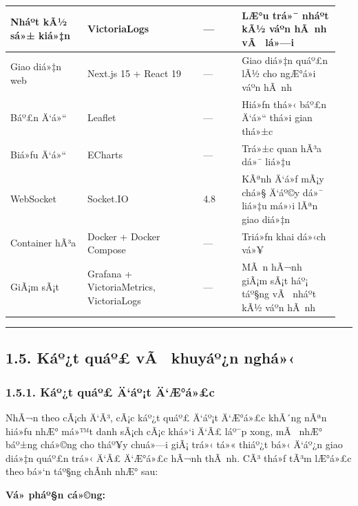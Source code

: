 \documentclass[a4paper]{extarticle}
\begin{document}
{\begin{longtable}{|L{0.223\linewidth}|L{0.334\linewidth}|L{0.115\linewidth}|L{0.282\linewidth}|}
Nháº­t kÃ½ sá»± kiá»‡n & VictoriaLogs & --- & LÆ°u trá»¯ nháº­t kÃ½ váº­n hÃ nh vÃ  lá»—i \\\hline
Giao diá»‡n web & Next.js 15 + React 19 & --- & Giao diá»‡n quáº£n lÃ½ cho
ngÆ°á»i váº­n hÃ nh \\\hline
Báº£n Ä‘á»“ & Leaflet & --- & Hiá»ƒn thá»‹ báº£n Ä‘á»“ thá»i gian thá»±c \\\hline
Biá»ƒu Ä‘á»“ & ECharts & --- & Trá»±c quan hÃ³a dá»¯ liá»‡u \\\hline
WebSocket & Socket.IO & 4.8 & KÃªnh Ä‘á»ƒ mÃ¡y chá»§ Ä‘áº©y dá»¯ liá»‡u má»›i lÃªn giao
diá»‡n \\\hline
Container hÃ³a & Docker + Docker Compose & --- & Triá»ƒn khai dá»‹ch vá»¥ \\\hline
GiÃ¡m sÃ¡t & Grafana + VictoriaMetrics, VictoriaLogs & --- & MÃ n hÃ¬nh giÃ¡m
sÃ¡t háº¡ táº§ng vÃ  nháº­t kÃ½ váº­n hÃ nh \\\hline
\end{longtable}
}

\begin{center}\rule{0.5\linewidth}{0.5pt}\end{center}

\subsection{1.5. Káº¿t quáº£ vÃ  khuyáº¿n
nghá»‹}\label{15-kux1ebft-quux1ea3-vuxe0-khuyux1ebfn-nghux1ecb}

\subsubsection{1.5.1. Káº¿t quáº£ Ä‘áº¡t
Ä‘Æ°á»£c}\label{151-kux1ebft-quux1ea3-ux111ux1ea1t-ux111ux1b0ux1ee3c}

NhÃ¬n theo cÃ¡ch Ä‘Ã³, cÃ¡c káº¿t quáº£ Ä‘áº¡t Ä‘Æ°á»£c khÃ´ng nÃªn hiá»ƒu nhÆ° má»™t danh sÃ¡ch
cÃ¡c khá»‘i Ä‘Ã£ láº¯p xong, mÃ  nhÆ° báº±ng chá»©ng cho tháº¥y chuá»—i giÃ¡ trá»‹ tá»« thiáº¿t
bá»‹ Ä‘áº¿n giao diá»‡n quáº£n trá»‹ Ä‘Ã£ Ä‘Æ°á»£c hÃ¬nh thÃ nh. CÃ³ thá»ƒ tÃ³m lÆ°á»£c theo bá»‘n táº§ng chÃ­nh
nhÆ° sau:

\textbf{Vá» pháº§n cá»©ng:}
\end{document}
